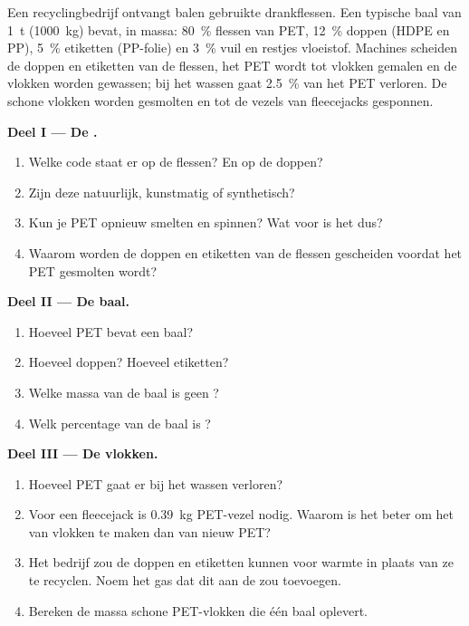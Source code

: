 \begin{problem}
\label{pb:g8:plastics:1}
Een recyclingbedrijf ontvangt balen gebruikte drankflessen. Een typische
baal van \qty{1}{t} (\qty{1000}{kg}) bevat, in massa: \qty{80}{\percent}
flessen van PET, \qty{12}{\percent} doppen (HDPE en PP),
\qty{5}{\percent} etiketten (PP-folie) en \qty{3}{\percent} vuil en
restjes vloeistof. Machines scheiden de doppen en etiketten van de
flessen, het PET wordt tot vlokken gemalen en de vlokken worden gewassen;
bij het wassen gaat \qty{2.5}{\percent} van het PET verloren. De schone
vlokken worden gesmolten en tot de vezels van fleecejacks gesponnen.

\medskip
\noindent\textbf{Deel I --- De .}
\begin{enumerate}
  \item Welke code staat er op de flessen? En op de doppen?
  \item Zijn deze  natuurlijk, kunstmatig of synthetisch?
  \item Kun je PET opnieuw smelten en spinnen? Wat voor  is het
        dus?
  \item Waarom worden de doppen en etiketten van de flessen gescheiden
        voordat het PET gesmolten wordt?
\end{enumerate}

\medskip
\noindent\textbf{Deel II --- De baal.}
\begin{enumerate}[resume]
  \item Hoeveel PET bevat een baal?
  \item Hoeveel doppen? Hoeveel etiketten?
  \item Welke massa van de baal is geen ?
  \item Welk percentage van de baal is ?
\end{enumerate}

\medskip
\noindent\textbf{Deel III --- De vlokken.}
\begin{enumerate}[resume]
  \item Hoeveel PET gaat er bij het wassen verloren?
  \item Voor een fleecejack is \qty{0.39}{kg} PET-vezel nodig. Waarom is
        het beter om het van vlokken te maken dan van nieuw PET?
  \item Het bedrijf zou de doppen en etiketten kunnen  voor
        warmte in plaats van ze te recyclen. Noem het gas dat dit aan de
         zou toevoegen.
  \item Bereken de massa schone PET-vlokken die één baal oplevert.
\end{enumerate}
\end{problem}
